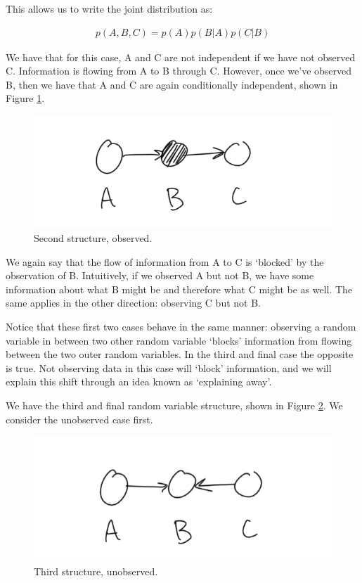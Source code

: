 This allows us to write the joint distribution as:

\begin{align*}
	p(A, B, C) = p(A) p(B | A) p(C | B)
\end{align*}

We have that for this case, A and C are not independent if we have not observed C. Information is flowing from A to B through C. However, once we've observed B, then we have that A and C are again conditionally independent, shown in Figure \ref{fig:second-case-observed}.

\begin{figure}
	\centering
	\includegraphics[width=0.5\paperwidth]{../GraphicalModels/fig/second-case-observed.png}
	\caption{Second structure, observed.}
	\label{fig:second-case-observed}
\end{figure}

We again say that the flow of information from A to C is `blocked' by the observation of B. Intuitively, if we observed A but not B, we have some information about what B might be and therefore what C might be as well.  The same applies in the other direction: observing C but not B.

Notice that these first two cases behave in the same manner: observing a random variable in between two other random variable `blocks' information from flowing between the two outer random variables. In the third and final case the opposite is true. Not observing data in this case will `block' information, and we will explain this shift through an idea known as `explaining away'.

We have the third and final random variable structure, shown in Figure \ref{fig:third-case-unobserved}. We consider the unobserved case first.
\begin{figure}
	\centering
	\includegraphics[width=0.5\paperwidth]{../GraphicalModels/fig/third-case-unobserved.png}
	\caption{Third structure, unobserved.}
	\label{fig:third-case-unobserved}
\end{figure}

